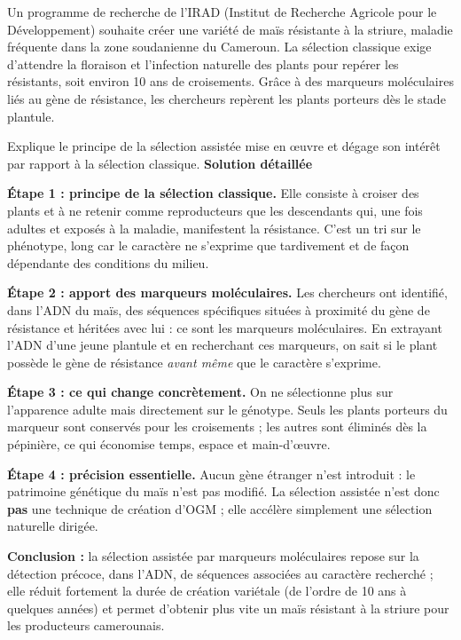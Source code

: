 \documentclass[11pt]{article}
\newcommand{\cle}[1]{{\popxbold\color{popdark}#1}}
\begin{document}
\begin{exoresolu}
Un programme de recherche de l'IRAD (Institut de Recherche Agricole pour le Développement) souhaite créer une variété de maïs résistante à la striure, maladie fréquente dans la zone soudanienne du Cameroun. La sélection classique exige d'attendre la floraison et l'infection naturelle des plants pour repérer les résistants, soit environ 10 ans de croisements. Grâce à des marqueurs moléculaires liés au gène de résistance, les chercheurs repèrent les plants porteurs dès le stade plantule.

Explique le principe de la sélection assistée mise en œuvre et dégage son intérêt par rapport à la sélection classique.
\tcblower
\textbf{Solution détaillée}

\textbf{Étape 1 : principe de la sélection classique.} Elle consiste à croiser des plants et à ne retenir comme reproducteurs que les descendants qui, une fois adultes et exposés à la maladie, manifestent la résistance. C'est un tri sur le \cle{phénotype}, long car le caractère ne s'exprime que tardivement et de façon dépendante des conditions du milieu.

\textbf{Étape 2 : apport des marqueurs moléculaires.} Les chercheurs ont identifié, dans l'ADN du maïs, des séquences spécifiques situées à proximité du gène de résistance et héritées avec lui : ce sont les \cle{marqueurs moléculaires}. En extrayant l'ADN d'une jeune plantule et en recherchant ces marqueurs, on sait si le plant possède le gène de résistance \emph{avant même} que le caractère s'exprime.

\textbf{Étape 3 : ce qui change concrètement.} On ne sélectionne plus sur l'apparence adulte mais directement sur le \cle{génotype}. Seuls les plants porteurs du marqueur sont conservés pour les croisements ; les autres sont éliminés dès la pépinière, ce qui économise temps, espace et main-d'œuvre.

\textbf{Étape 4 : précision essentielle.} Aucun gène étranger n'est introduit : le patrimoine génétique du maïs n'est pas modifié. La sélection assistée n'est donc \textbf{pas} une technique de création d'OGM ; elle accélère simplement une sélection naturelle dirigée.

\textbf{Conclusion :} la sélection assistée par marqueurs moléculaires repose sur la détection précoce, dans l'ADN, de séquences associées au caractère recherché ; elle réduit fortement la durée de création variétale (de l'ordre de 10 ans à quelques années) et permet d'obtenir plus vite un maïs résistant à la striure pour les producteurs camerounais.
\end{exoresolu}
\end{document}
